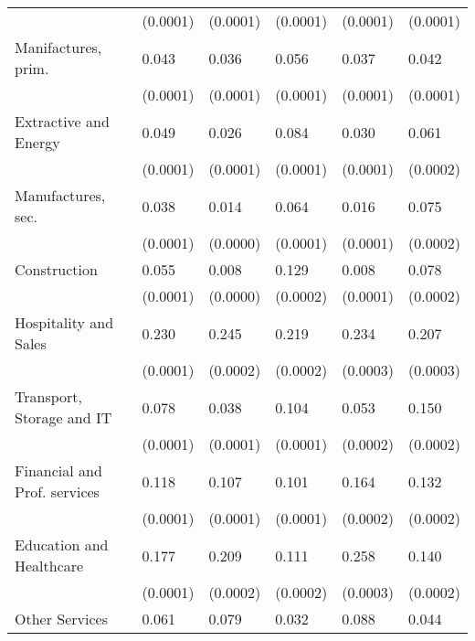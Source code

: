 \begin{tabular}{llllll}
                             &  (0.0001) &  (0.0001) &  (0.0001) &           (0.0001) &         (0.0001) \\
Manifactures, prim.          &     0.043 &     0.036 &     0.056 &              0.037 &            0.042 \\
                             &  (0.0001) &  (0.0001) &  (0.0001) &           (0.0001) &         (0.0001) \\
Extractive and Energy        &     0.049 &     0.026 &     0.084 &              0.030 &            0.061 \\
                             &  (0.0001) &  (0.0001) &  (0.0001) &           (0.0001) &         (0.0002) \\
Manufactures, sec.           &     0.038 &     0.014 &     0.064 &              0.016 &            0.075 \\
                             &  (0.0001) &  (0.0000) &  (0.0001) &           (0.0001) &         (0.0002) \\
Construction                 &     0.055 &     0.008 &     0.129 &              0.008 &            0.078 \\
                             &  (0.0001) &  (0.0000) &  (0.0002) &           (0.0001) &         (0.0002) \\
Hospitality and Sales        &     0.230 &     0.245 &     0.219 &              0.234 &            0.207 \\
                             &  (0.0001) &  (0.0002) &  (0.0002) &           (0.0003) &         (0.0003) \\
Transport, Storage and IT    &     0.078 &     0.038 &     0.104 &              0.053 &            0.150 \\
                             &  (0.0001) &  (0.0001) &  (0.0001) &           (0.0002) &         (0.0002) \\
Financial and Prof. services &     0.118 &     0.107 &     0.101 &              0.164 &            0.132 \\
                             &  (0.0001) &  (0.0001) &  (0.0001) &           (0.0002) &         (0.0002) \\
Education and Healthcare     &     0.177 &     0.209 &     0.111 &              0.258 &            0.140 \\
                             &  (0.0001) &  (0.0002) &  (0.0002) &           (0.0003) &         (0.0002) \\
Other Services               &     0.061 &     0.079 &     0.032 &              0.088 &            0.044 \\

\end{tabular}
